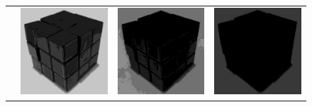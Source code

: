 \begin{figure}
\begin{tabular}{rccc}
         \raisebox{\raiselength}{Blue} &
         \includegraphics[width=\rubiklength]{img/rubik/1_rgb_b.jpg} & 
         \includegraphics[width=\rubiklength]{img/rubik/2_rgb_b.jpg} & \includegraphics[width=\rubiklength]{img/rubik/3_rgb_b.jpg}\\
         

\end{tabular}
\end{figure}

